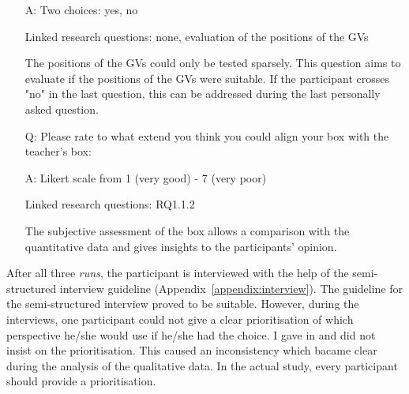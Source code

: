 \begin{itemize}
	\item[A:] Two choices: yes, no
	\item[] Linked research questions: none, evaluation of the positions of the GVs
	\item[] The positions of the GVs could only be tested sparsely. This question aims to evaluate if the positions of the GVs were suitable. If the participant crosses "no" in the last question, this can be addressed during the last personally asked question.
	\item[Q:] Please rate to what extend you think you could align your box with the teacher's box:
	\item[A:] Likert scale from 1 (very good) - 7 (very poor)
	\item[] Linked research questions: RQ1.1.2
	\item[] The subjective assessment of the box allows a comparison with the quantitative data and gives insights to the participants' opinion. 
\end{itemize}
After all three \textit{runs}, the participant is interviewed with the help of the semi-structured interview guideline (Appendix~\ref{appendix:interview}). The guideline for the semi-structured interview proved to be suitable. However, during the interviews, one participant could not give a clear prioritisation of which perspective he/she would use if he/she had the choice. I gave in and did not insist on the prioritisation. This caused an inconsistency which bacame clear during the analysis of the qualitative data. In the actual study, every participant should provide a prioritisation.

